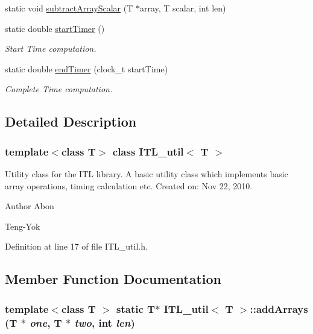 \begin{DoxyCompactItemize}
\item 
static void \hyperlink{classITL__util_a447741f40abd631431a41ff21a3f77b8}{subtractArrayScalar} (T $\ast$array, T scalar, int len)
\item 
static double \hyperlink{classITL__util_a46636a5a7bb9b109b342e403825c8ea9}{startTimer} ()
\begin{DoxyCompactList}\small\item\em Start Time computation. \item\end{DoxyCompactList}\item 
static double \hyperlink{classITL__util_aedbe31ffc820a9a99f4fbcea35f184ca}{endTimer} (clock\_\-t startTime)
\begin{DoxyCompactList}\small\item\em Complete Time computation. \item\end{DoxyCompactList}\end{DoxyCompactItemize}


\subsection{Detailed Description}
\subsubsection*{template$<$class T$>$ class ITL\_\-util$<$ T $>$}

Utility class for the ITL library. A basic utility class which implements basic array operations, timing calculation etc. Created on: Nov 22, 2010. \begin{DoxyAuthor}{Author}
Abon 

Teng-\/Yok 
\end{DoxyAuthor}


Definition at line 17 of file ITL\_\-util.h.



\subsection{Member Function Documentation}
\hypertarget{classITL__util_a8d0970f66d8443b106ec3b2b56008193}{
\subsubsection[{addArrays}]{\setlength{\rightskip}{0pt plus 5cm}template$<$class T $>$ static T$\ast$ {\bf ITL\_\-util}$<$ T $>$::addArrays (T $\ast$ {\em one}, \/  T $\ast$ {\em two}, \/  int {\em len})}}
\label{classITL__util_a8d0970f66d8443b106ec3b2b56008193}


